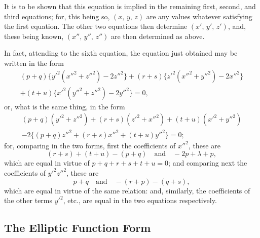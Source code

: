 \documentclass[11pt,a4paper]{book}
\begin{document}
It is to be shown that this equation is implied in the remaining first, second, and third equations; for, this being so, $(x,\, y,\, z)$ are any values whatever satisfying the first equation. The other two equations then determine $(x',\, y',\, z')$, and, these being known, $(x'',\, y'',\, z'')$ are then determined as above.

In fact, attending to the sixth equation, the equation just obtained may be written in the form
\begin{multline*}
(p+q)\{y'^{2}(x''^{2} + z''^{2}) - 2z''^{2}\} + (r+s)\{z'^{2}(x''^{2} + y''^{2}) - 2x''^{2}\} \\
+ (t+u)\{x'^{2}(y''^{2} + z''^{2}) - 2y''^{2}\} = 0,
\end{multline*}
or, what is the same thing, in the form
\begin{multline*}
(p+q)(y'^{2} + z''^{2}) + (r+s)(z'^{2} + x''^{2}) + (t+u)(x'^{2} + y''^{2}) \\
- 2\{(p+q)z''^{2} + (r+s)x''^{2} + (t+u)y''^{2}\} = 0;
\end{multline*}
for, comparing in the two forms, first the coefficients of $x''^{2}$, these are
\[
(r+s) + (t+u) - (p+q)\quad \text{and}\quad -2p + \lambda + p,
\]
which are equal in virtue of $p+q+r+s+t+u=0$; and comparing next the coefficients of $y'^{2}z''^{2}$, these are
\[
p+q\quad \text{and}\quad -(r+p) - (q+s),
\]
which are equal in virtue of the same relation: and, similarly, the coefficients of the other terms $y'^{2}$, etc., are equal in the two equations respectively.

\subsection*{The Elliptic Function Form}
\end{document}
